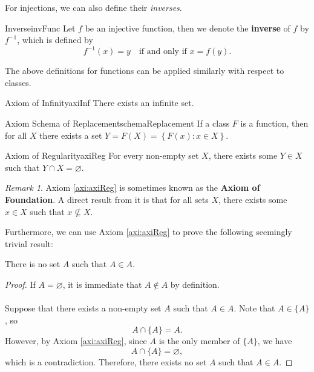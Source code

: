 \documentclass[math]{amznotes}
\theoremstyle{remark}
\newtheorem*{remark}{Remark}
\begin{document}
For injections, we can also define their \textit{inverses}.
\begin{dfnbox}{Inverse}{invFunc}
    Let $f$ be an injective function, then we denote the {\color{red} \textbf{inverse}} of $f$ by $f^{-1}$, which is defined by
    \begin{displaymath}
        f^{-1}(x) = y \quad \textrm{if and only if } x = f(y). 
    \end{displaymath}
\end{dfnbox}
The above definitions for functions can be applied similarly with respect to classes.
\begin{axibox}{Axiom of Infinity}{axiInf}
    There exists an infinite set.
\end{axibox}
\begin{axibox}{Axiom Schema of Replacement}{schemaReplacement}
    If a class $F$ is a function, then for all $X$ there exists a set $Y = F(X) = \left\{F(x) \colon x \in X\right\}$.
\end{axibox}
\begin{axibox}{Axiom of Regularity}{axiReg}
    For every non-empty set $X$, there exists some $Y \in X$ such that $Y \cap X = \varnothing$.
\end{axibox}
\begin{notebox}
    \begin{remark}
        Axiom \ref{axi:axiReg} is sometimes known as the {\color{red} \textbf{Axiom of Foundation}}. A direct result from it is that for all sets $X$, there exists some $x \in X$ such that $x \not\subseteq X$.
    \end{remark}
\end{notebox}
Furthermore, we can use Axiom \ref{axi:axiReg} to prove the following seemingly trivial result:
\begin{thmbox}{}{}
    There is no set $A$ such that $A \in A$.
    \tcblower   
    \begin{proof}
        If $A = \varnothing$, it is immediate that $A \notin A$ by definition.
        \\\\
        Suppose that there exists a non-empty set $A$ such that $A \in A$. Note that $A \in \{A\}$, so 
        \begin{equation*}
            A \cap \{A\} = A.
        \end{equation*}
        However, by Axiom \ref{axi:axiReg}, since $A$ is the only member of $\{A\}$, we have 
        \begin{equation*}
            A \cap \{A\} = \varnothing,
        \end{equation*}
        which is a contradiction. Therefore, there exists no set $A$ such that $A \in A$.
    \end{proof}
\end{thmbox}
\end{document}

